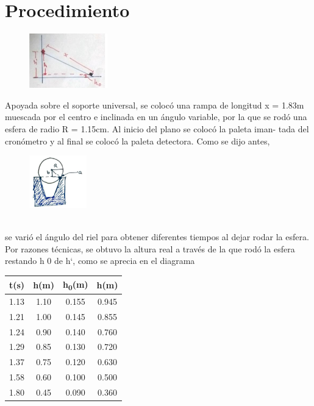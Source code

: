 \section{Procedimiento}
\begin{minipage}{0.22\linewidth}
    \begin{figure}[H]
        \centering
        \includegraphics[scale=0.75]{Images/ima2.png}
        \label{fig:ima2}
    \end{figure}
\end{minipage}
\begin{minipage}{0.58\linewidth}
    Apoyada sobre el soporte universal, se colocó una rampa de
longitud x = 1.83m muescada por el centro e inclinada en
un ángulo variable, por la que se rodó una esfera de radio
R = 1.15cm. Al inicio del plano se colocó la paleta iman-
tada del cronómetro y al final se colocó la paleta detectora.
Como se dijo antes,
\end{minipage}
\begin{minipage}{0.2\linewidth}
    \begin{figure}[H]
        \includegraphics[scale=1]{Images/ima3.png}
        \label{fig:ima3}
    \end{figure}
\end{minipage}
\vspace{-0.7cm}\\
se varió el ángulo del riel para obtener diferentes tiempos al dejar rodar la esfera. Por razones técnicas, se obtuvo la altura real a través de la que
rodó la esfera restando h 0 de h‘, como se aprecia en el diagrama\\
\begin{minipage}{0.4\linewidth}
    \begin{table}[H]
        \centering
        \begin{tabular}{cccc} \hline
            t(s) & h(m)& h\textsubscript{0}(m)& h(m) \\ \hline
1.13&1.10 &0.155 &0.945\\
1.21&1.00 &0.145 &0.855\\
1.24&0.90 &0.140 &0.760\\
1.29&0.85 &0.130 &0.720\\
1.37&0.75 &0.120 &0.630\\
1.58&0.60 &0.100 &0.500\\
1.80&0.45 &0.090 &0.360\\ \hline
        \end{tabular}
    \end{table}
\end{minipage}
